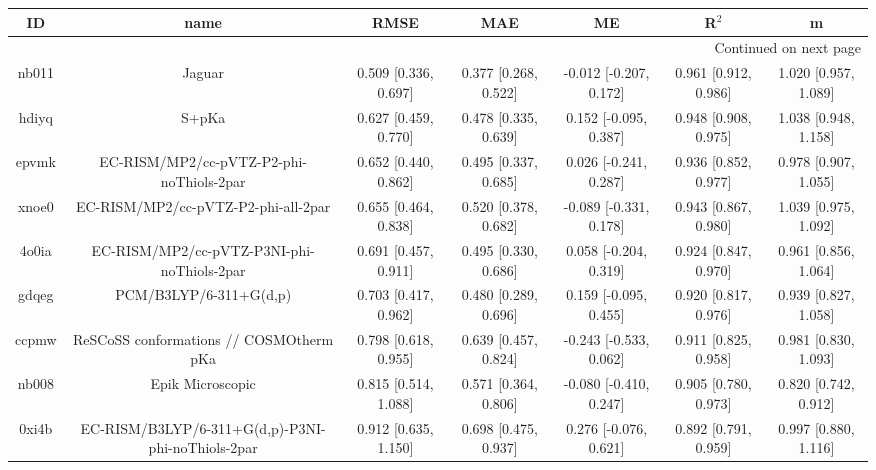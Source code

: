 \documentclass{article}
\begin{document}
\begin{center}
\begin{longtable}{|ccccccc|}
\toprule
    ID &                                               name &                  RMSE &                   MAE &                       ME &                 R$^2$ &                      m \\
\midrule
\endhead
\midrule
\multicolumn{7}{r}{{Continued on next page}} \\
\midrule
\endfoot

\bottomrule
\endlastfoot
 nb011 &                                             Jaguar &  0.509 [0.336, 0.697] &  0.377 [0.268, 0.522] &   -0.012 [-0.207, 0.172] &  0.961 [0.912, 0.986] &   1.020 [0.957, 1.089] \\
 hdiyq &                                              S+pKa &  0.627 [0.459, 0.770] &  0.478 [0.335, 0.639] &    0.152 [-0.095, 0.387] &  0.948 [0.908, 0.975] &   1.038 [0.948, 1.158] \\
 epvmk &           EC-RISM/MP2/cc-pVTZ-P2-phi-noThiols-2par &  0.652 [0.440, 0.862] &  0.495 [0.337, 0.685] &    0.026 [-0.241, 0.287] &  0.936 [0.852, 0.977] &   0.978 [0.907, 1.055] \\
 xnoe0 &                EC-RISM/MP2/cc-pVTZ-P2-phi-all-2par &  0.655 [0.464, 0.838] &  0.520 [0.378, 0.682] &   -0.089 [-0.331, 0.178] &  0.943 [0.867, 0.980] &   1.039 [0.975, 1.092] \\
 4o0ia &         EC-RISM/MP2/cc-pVTZ-P3NI-phi-noThiols-2par &  0.691 [0.457, 0.911] &  0.495 [0.330, 0.686] &    0.058 [-0.204, 0.319] &  0.924 [0.847, 0.970] &   0.961 [0.856, 1.064] \\
 gdqeg &                             PCM/B3LYP/6-311+G(d,p) &  0.703 [0.417, 0.962] &  0.480 [0.289, 0.696] &    0.159 [-0.095, 0.455] &  0.920 [0.817, 0.976] &   0.939 [0.827, 1.058] \\
 ccpmw &            ReSCoSS conformations // COSMOtherm pKa &  0.798 [0.618, 0.955] &  0.639 [0.457, 0.824] &   -0.243 [-0.533, 0.062] &  0.911 [0.825, 0.958] &   0.981 [0.830, 1.093] \\
 nb008 &                                   Epik Microscopic &  0.815 [0.514, 1.088] &  0.571 [0.364, 0.806] &   -0.080 [-0.410, 0.247] &  0.905 [0.780, 0.973] &   0.820 [0.742, 0.912] \\
 0xi4b &  EC-RISM/B3LYP/6-311+G(d,p)-P3NI-phi-noThiols-2par &  0.912 [0.635, 1.150] &  0.698 [0.475, 0.937] &    0.276 [-0.076, 0.621] &  0.892 [0.791, 0.959] &   0.997 [0.880, 1.116] \\

\end{longtable}
\end{center}
\end{document}
